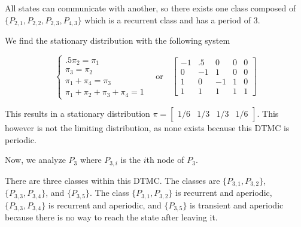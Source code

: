 \documentclass[10pt,a4paper]{exam}
\begin{document}
\begin{questions}
\begin{solution}
All states can communicate with another, so there exists one class composed of $\{P_{2,1}, P_{2,2}, P_{2,3}, P_{4,3}\}$ which is a recurrent class and has a period of 3.

We find the stationary distribution with the following system

$$\begin{cases} .5\pi_2 = \pi_1\\ \pi_3 = \pi_2 \\ \pi_1 + \pi_4 = \pi_3\\ \pi_1 + \pi_2 + \pi_3 + \pi_4 = 1 \end{cases} \quad \text{or} \quad
\begin{bmatrix}
-1 & .5 & 0 & 0 & 0\\
0 & -1 & 1 & 0 & 0\\
1 & 0 & -1 & 1 & 0\\
1 & 1 & 1 & 1 & 1
\end{bmatrix}$$

This results in a stationary distribution $\pi = \begin{bmatrix}1/6 & 1/3 & 1/3 & 1/6 \end{bmatrix}$. This however is not the limiting distribution, as none exists because this DTMC is periodic.

Now, we analyze $P_3$ where $P_{3,i}$ is the $i$th node of $P_3$.

\begin{center}
\end{center}

There are three classes within this DTMC. The classes are $\{P_{3,1}, P_{3,2}\}$, $\{P_{3,3},P_{3,4}\}$, and $\{P_{3,5}\}$. The class $\{P_{3,1}, P_{3,2}\}$ is recurrent and aperiodic, $\{P_{3,3},P_{3,4}\}$ is recurrent and aperiodic, and $\{P_{3,5}\}$ is transient and aperiodic because there is no way to reach the state after leaving it. 


\end{solution}
\end{questions}
\end{document}
